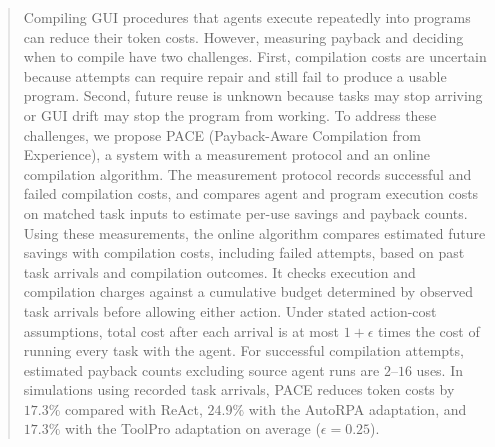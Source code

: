 \begin{abstract}
Compiling GUI procedures that agents execute repeatedly into programs can reduce their token costs.
However, measuring payback and deciding when to compile have two challenges.
First, compilation costs are uncertain because attempts can require repair and still fail to produce a usable program.
Second, future reuse is unknown because tasks may stop arriving or GUI drift may stop the program from working.
To address these challenges, we propose PACE (Payback-Aware Compilation from Experience), a system with a measurement protocol and an online compilation algorithm.
The measurement protocol records successful and failed compilation costs, and compares agent and program execution costs on matched task inputs to estimate per-use savings and payback counts.
Using these measurements, the online algorithm compares estimated future savings with compilation costs, including failed attempts, based on past task arrivals and compilation outcomes.
It checks execution and compilation charges against a cumulative budget determined by observed task arrivals before allowing either action.
Under stated action-cost assumptions, total cost after each arrival is at most $1+\epsilon$ times the cost of running every task with the agent.
For successful compilation attempts, estimated payback counts excluding source agent runs are $2$--$16$ uses.
In simulations using recorded task arrivals, PACE reduces token costs by $17.3\%$ compared with ReAct, $24.9\%$ with the AutoRPA adaptation, and $17.3\%$ with the ToolPro adaptation on average ($\epsilon=0.25$).
\end{abstract}
